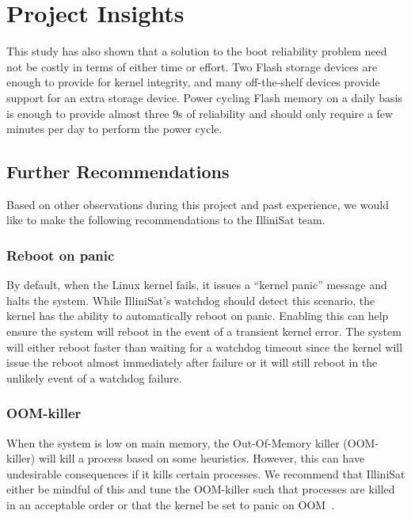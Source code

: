 \section{Project Insights}\label{sec:insights}

This study has also shown that a solution to the boot reliability problem need not be costly in terms of either time or effort.  Two Flash storage devices are enough to provide for kernel integrity, and many off-the-shelf devices provide support for an extra storage device.  Power cycling Flash memory on a daily basis is enough to provide almost three 9s of reliability and should only require a few minutes per day to perform the power cycle.

\subsection{Further Recommendations}
Based on other observations during this project and past experience, we would
like to make the following recommendations to the IlliniSat team.

\subsubsection{Reboot on panic} By default, when the Linux kernel fails, it
issues a ``kernel panic'' message and halts the system.  While IlliniSat's
watchdog should detect this scenario, the kernel has the ability to
automatically reboot on panic.  Enabling this can help ensure the system will
reboot in the event of a transient kernel error. The system will either reboot
faster than waiting for a watchdog timeout since the kernel will issue the
reboot almost immediately after failure or it will still reboot in the unlikely
event of a watchdog failure.

\subsubsection{OOM-killer} When the system is low on main memory, the
Out-Of-Memory killer (OOM-killer) will kill a process based on some heuristics.
However, this can have undesirable consequences if it kills certain processes.
We recommend that IlliniSat either be mindful of this and tune the OOM-killer
such that processes are killed in an acceptable order or that the kernel be set
to panic on OOM~\cite{oracleoom}.
